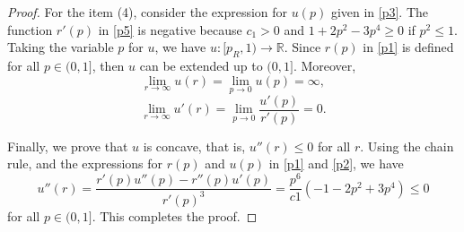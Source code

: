 \documentclass[10pt,a4paper]{amsart}
\def\r{\mathbb R}
\begin{document}
\begin{proof}
For the item (4), consider the expression for $u(p)$ given in \eqref{p3}. The function $r'(p)$ in \eqref{p5} is negative because $c_1>0$ and $1+2p^2-3p^4\geq 0$ if $p^2\leq 1$. Taking the variable $p$   for $u$, we have $u\colon [p_R,1)\to\r$. Since $r(p)$ in \eqref{p1} is defined for all $p\in (0,1]$, then $u$ can be extended up to $(0,1]$. Moreover, 
$$\lim_{r\to\infty}u(r)= \lim_{p\to 0}u(p)=\infty,$$
$$\lim_{r\to\infty}u'(r)= \lim_{p\to 0}\frac{u'(p)}{r'(p)}=0.$$ 

Finally, we prove that $u$ is concave, that is, $u''(r)\leq 0$ for all $r$. Using the chain rule, and the expressions for $r(p)$ and $u(p)$ in \eqref{p1} and \eqref{p2}, we have 
$$u''(r)=\frac{r'(p)u''(p)-r''(p)u'(p)}{r'(p)^3}=\frac{p^6}{c1}(-1-2p^2+3p^4)\leq 0$$
for all $p\in (0,1]$. This completes the proof.

\end{proof}
\end{document}
